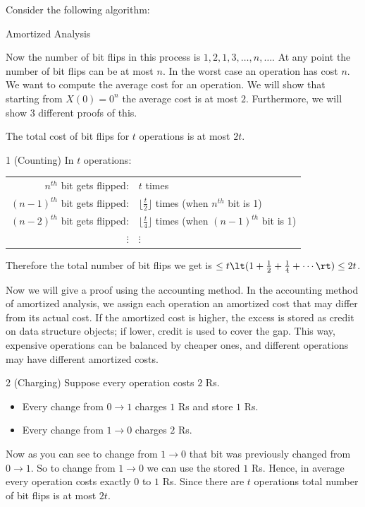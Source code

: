 Consider the following algorithm:
\begin{algorithm}[]
	\caption{Amortized Analysis}
	\DontPrintSemicolon
\end{algorithm}
Now the number of bit flips in this process is $1,2,1,3,\dots, n,\dots$. At any point the number of bit flips can be at most $n$. In the worst case an operation has cost $n$. We want to compute the average cost for an operation. We will show that starting from $X(0)=0^n$ the average cost is at most $2$. Furthermore, we will show 3 different proofs of this.
\begin{lemma}{}{}
	The total  cost of bit flips for $t$ operations is at most $2t$.
\end{lemma}
\begin{proofmany}{1 (Counting)}
	In $t$ operations:
	\begin{center}
		\begin{tabular}{rl}
			$n^{th}$ bit gets flipped:     & $t$ times                                                    \\
			$(n-1)^{th}$ bit gets flipped: & $\lfloor\frac{t}2\rfloor$ times (when $n^{th}$ bit is 1)     \\
			$(n-2)^{th}$ bit gets flipped: & $\lfloor\frac{t}4\rfloor$ times (when $(n-1)^{th}$ bit is 1) \\
			$\vdots$\hspace{1cm}           & \hspace{1cm}$\vdots$
		\end{tabular}
	\end{center}
	Therefore the total number of bit flips we get is $\leq t\lt(1+\frac12+\frac14+\cdots\rt)\leq 2t$.
\end{proofmany}

Now we will give a proof using the accounting method. In the accounting method of amortized analysis, we assign each operation an amortized cost that may differ from its actual cost. If the amortized cost is higher, the excess is stored as credit on data structure objects; if lower, credit is used to cover the gap. This way, expensive operations can be balanced by cheaper ones, and different operations may have different amortized costs.

\begin{proofmany}{2 (Charging)}
	Suppose every operation costs $2$ Rs. \begin{itemize}
		\item Every change from $0\to 1$ charges $1$ Rs and store $1$ Rs.
		\item Every change from $1\to 0$ charges $2$ Rs.
	\end{itemize}
	Now as you can see to change from $1\to 0$ that bit was previously changed from $0\to 1$. So to change from $1\to 0$ we can use the stored $1$ Rs. Hence, in average every operation costs exactly $0$ to $1$ Rs. Since there are $t$ operations total number of bit flips is at most $2t$.
\end{proofmany}

